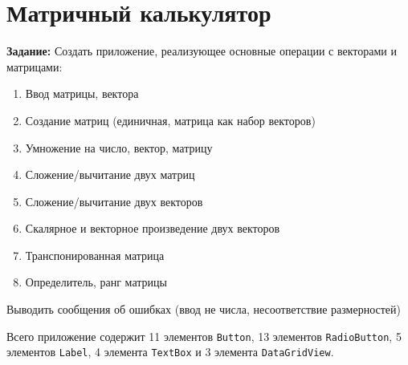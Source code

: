 \section{Матричный калькулятор}
\textbf{Задание:} Создать приложение, реализующее основные операции с векторами и матрицами:

\begin{enumerate}
    \item Ввод матрицы, вектора
    \item Создание матриц (единичная, матрица как набор векторов)
    \item Умножение на число, вектор, матрицу
    \item Сложение/вычитание двух матриц
    \item Сложение/вычитание двух векторов
    \item Скалярное и векторное произведение двух векторов
    \item Транспонированная матрица
    \item Определитель, ранг матрицы
\end{enumerate}
Выводить сообщения об ошибках (ввод не числа, несоответствие размерностей)


Всего приложение  содержит 11 элементов \verb|Button|, 13 элементов \verb|RadioButton|,
5 элементов \verb|Label|, 4 элемента \verb|TextBox| и 3 элемента \verb|DataGridView|.


